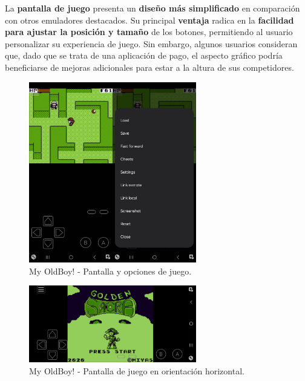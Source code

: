 \clearpage

La \textbf{pantalla de juego} presenta un \textbf{diseño más simplificado} en comparación con otros emuladores destacados. Su principal \textbf{ventaja} radica en la \textbf{facilidad para ajustar la posición y tamaño} de los botones, permitiendo al usuario personalizar su experiencia de juego. Sin embargo, algunos usuarios consideran que, dado que se trata de una aplicación de pago, el aspecto gráfico podría beneficiarse de mejoras adicionales para estar a la altura de sus competidores.

\begin{figure}[h]
    \centering
    \includegraphics[width=0.65\textwidth]{include/images/myoldboy3.jpg}
    \caption{My OldBoy! - Pantalla y opciones de juego.}
    \label{figure:oldboy3}
\end{figure}
\begin{figure}[H]
    \centering
    \includegraphics[width=0.65\textwidth]{include/images/myoldboyportrait.jpg}
    \caption{My OldBoy! - Pantalla de juego en orientación horizontal.}
    \label{figure:oldboy4}
\end{figure}

\clearpage

